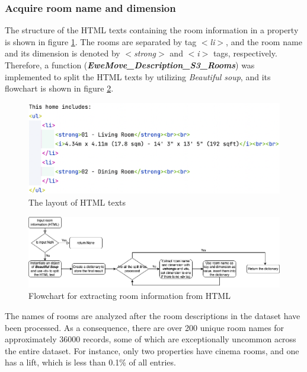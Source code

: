 \documentclass[12pt,twoside]{report}
\begin{document}
\subsubsection{Acquire room name and dimension}
The structure of the HTML texts containing the room information in a property is shown in figure \ref{html_structure}. The rooms are separated by tag \textit{$<$li$>$}, and the room name and its dimension is denoted by \textit{$<$strong$>$} and \textit{$<$i$>$} tags, respectively. Therefore, a function (\textit{\textbf{EweMove\_Description\_S3\_Rooms}}) was implemented to split the HTML texts by utilizing \textit{Beautiful soup}, and its flowchart is shown in figure \ref{html_room_info}.
\begin{figure}[!htbp]
	\centering
	\includegraphics[width=15cm]{html_structure}
	\caption{The layout of HTML texts}
	\label{html_structure}
\end{figure}

\begin{figure}[!htbp]
	\centering
	\includegraphics[width=1\linewidth]{html_room_info}
	\caption{Flowchart for extracting room information from HTML}
	\label{html_room_info}
\end{figure}

The names of rooms are analyzed after the room descriptions in the dataset have been processed. As a consequence, there are over 200 unique room names for approximately 36000 records, some of which are exceptionally uncommon across the entire dataset. For instance, only two properties have cinema rooms, and one has a lift, which is less than 0.1\% of all entries.  
\\
\end{document}
